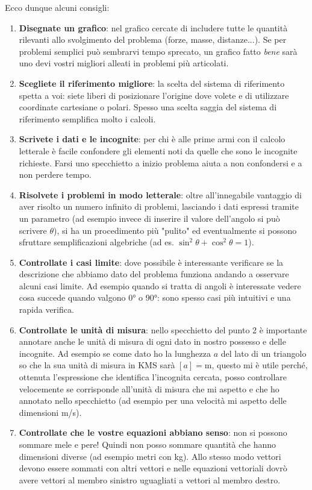 \documentclass[12pt,a4paper]{book}
\begin{document}
Ecco dunque alcuni consigli:

\begin{enumerate}
\item \textbf{Disegnate un grafico}: nel grafico cercate di includere tutte le quantità rilevanti allo svolgimento del problema (forze, masse, distanze...). Se per problemi semplici può sembrarvi tempo sprecato, un grafico fatto \textit{bene} sarà uno devi vostri migliori alleati in problemi più articolati.
\item \textbf{Scegliete il riferimento migliore}: la scelta del sistema di riferimento spetta a voi: siete liberi di posizionare l'origine dove volete e di utilizzare coordinate cartesiane o polari. Spesso una scelta saggia del sistema di riferimento semplifica molto i calcoli.
\item \textbf{Scrivete i dati e le incognite}: per chi è alle prime armi con il calcolo letterale è facile confondere gli elementi noti da quelle che sono le incognite richieste. Farsi uno specchietto a inizio problema aiuta a non confondersi e a non perdere tempo.
\item \textbf{Risolvete i problemi in modo letterale}: oltre all'innegabile vantaggio di aver risolto un numero infinito di problemi, lasciando i dati espressi tramite un parametro (ad esempio invece di inserire il valore dell'angolo si può scrivere $\theta$), si ha un procedimento più "pulito" ed eventualmente si possono sfruttare semplificazioni algebriche (ad es. $\sin^2\theta+\cos^2\theta=1$).
\item \textbf{Controllate i casi limite}: dove possibile è interessante verificare se la descrizione che abbiamo dato del problema funziona andando a osservare alcuni casi limite. Ad esempio quando si tratta di angoli è interessate vedere cosa succede quando valgono 0° o 90°: sono spesso casi più intuitivi e una rapida verifica.
\item \textbf{Controllate le unità di misura}: nello specchietto del punto 2 è importante annotare anche le unità di misura di ogni dato in nostro possesso e delle incognite. Ad esempio se come dato ho la lunghezza $a$ del lato di un triangolo so che la sua unità di misura in KMS sarà $[a]=	\text{m}$, questo mi è utile perché, ottenuta l'espressione che identifica l'incognita cercata, posso controllare velocemente se corrisponde all'unità di misura che mi aspetto e che ho annotato nello specchietto (ad esempio per una velocità mi aspetto delle dimensioni m/s). 
\item \textbf{Controllate che le vostre equazioni abbiano senso}: non si possono sommare mele e pere! Quindi non posso sommare quantità che hanno dimensioni diverse (ad esempio metri con kg). Allo stesso modo vettori devono essere sommati con altri vettori e nelle equazioni vettoriali dovrò avere vettori al membro sinistro uguagliati a vettori al membro destro.

\end{enumerate}
\end{document}
